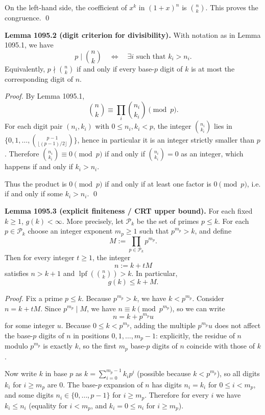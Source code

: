 On the left-hand side, the coefficient of $x^k$ in $(1+x)^n$ is $\binom{n}{k}$. This proves the congruence. \qed

\smallskip
\noindent\textbf{Lemma 1095.2 (digit criterion for divisibility).}
With notation as in Lemma 1095.1, we have
\[
 p\mid\binom{n}{k}\quad\Longleftrightarrow\quad \exists i\text{ such that }k_i>n_i.
\]
Equivalently, $p\nmid\binom{n}{k}$ if and only if every base-$p$ digit of $k$ is at most the corresponding digit of $n$.

\smallskip
\noindent\emph{Proof.}
By Lemma 1095.1,
\[
\binom{n}{k}\equiv \prod_i \binom{n_i}{k_i} \pmod p.
\]
For each digit pair $(n_i,k_i)$ with $0\le n_i,k_i<p$, the integer $\binom{n_i}{k_i}$ lies in $\{0,1,\dots,\binom{p-1}{\lfloor (p-1)/2\rfloor}\}$, hence in particular it is an integer strictly smaller than $p$. Therefore $\binom{n_i}{k_i}\equiv 0\pmod p$ if and only if $\binom{n_i}{k_i}=0$ as an integer, which happens if and only if $k_i>n_i$.

Thus the product is $0\pmod p$ if and only if at least one factor is $0\pmod p$, i.e. if and only if some $k_i>n_i$. \qed

\smallskip
\noindent\textbf{Lemma 1095.3 (explicit finiteness / CRT upper bound).}
For each fixed $k\ge 1$, $g(k)<\infty$. More precisely, let $\mathcal{P}_k$ be the set of primes $p\le k$. For each $p\in\mathcal{P}_k$ choose an integer exponent $m_p\ge 1$ such that $p^{m_p}>k$, and define
\[
M:=\prod_{p\in\mathcal{P}_k} p^{m_p}.
\]
Then for every integer $t\ge 1$, the integer
\[
 n:=k+tM
\]
satisfies $n>k+1$ and $\operatorname{lpf}(\binom{n}{k})>k$. In particular,
\[
 g(k)\le k+M.
\]

\smallskip
\noindent\emph{Proof.}
Fix a prime $p\le k$. Because $p^{m_p}>k$, we have $k<p^{m_p}$. Consider $n=k+tM$. Since $p^{m_p}\mid M$, we have $n\equiv k\pmod{p^{m_p}}$, so we can write
\[
 n=k + p^{m_p}u
\]
for some integer $u$. Because $0\le k<p^{m_p}$, adding the multiple $p^{m_p}u$ does not affect the base-$p$ digits of $n$ in positions $0,1,\dots,m_p-1$: explicitly, the residue of $n$ modulo $p^{m_p}$ is exactly $k$, so the first $m_p$ base-$p$ digits of $n$ coincide with those of $k$.

Now write $k$ in base $p$ as $k=\sum_{i=0}^{m_p-1} k_i p^i$ (possible because $k<p^{m_p}$), so all digits $k_i$ for $i\ge m_p$ are $0$. The base-$p$ expansion of $n$ has digits $n_i=k_i$ for $0\le i<m_p$, and some digits $n_i\in\{0,\dots,p-1\}$ for $i\ge m_p$. Therefore for every $i$ we have $k_i\le n_i$ (equality for $i<m_p$, and $k_i=0\le n_i$ for $i\ge m_p$).

